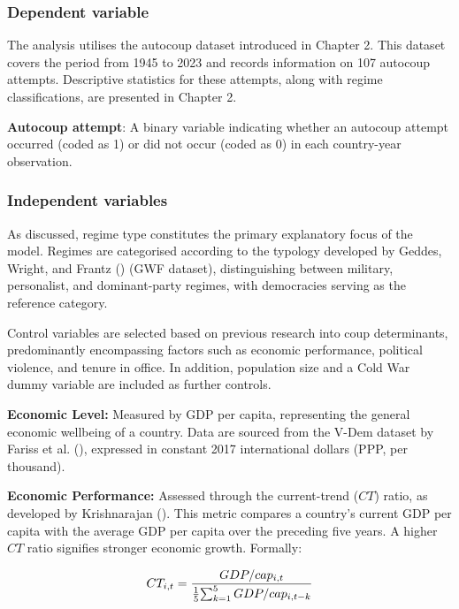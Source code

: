 \documentclass[
  12pt,
]{report}
\begin{document}
\subsubsection*{Dependent variable}\label{dependent-variable}

The analysis utilises the autocoup dataset introduced in Chapter 2. This
dataset covers the period from 1945 to 2023 and records information on
107 autocoup attempts. Descriptive statistics for these attempts, along
with regime classifications, are presented in Chapter 2.

\textbf{Autocoup attempt}: A binary variable indicating whether an
autocoup attempt occurred (coded as 1) or did not occur (coded as 0) in
each country-year observation.

\subsubsection*{Independent variables}\label{independent-variables}

As discussed, regime type constitutes the primary explanatory focus of
the model. Regimes are categorised according to the typology developed
by Geddes, Wright, and Frantz () (GWF
dataset), distinguishing between military, personalist, and
dominant-party regimes, with democracies serving as the reference
category.

Control variables are selected based on previous research into coup
determinants, predominantly encompassing factors such as economic
performance, political violence, and tenure in office. In addition,
population size and a Cold War dummy variable are included as further
controls.

\textbf{Economic Level:} Measured by GDP per capita, representing the
general economic wellbeing of a country. Data are sourced from the V-Dem
dataset by Fariss et al. (), expressed in
constant 2017 international dollars (PPP, per thousand).

\textbf{Economic Performance:} Assessed through the current-trend
(\(CT\)) ratio, as developed by Krishnarajan
(). This metric compares a
country's current GDP per capita with the average GDP per capita over
the preceding five years. A higher \(CT\) ratio signifies stronger
economic growth. Formally:

\[
    \begin{aligned}
    CT_{i,t} = {GDP/cap_{i,t} \over {1 \over 5} {\sum_{k=1}^5GDP/cap_{i,t-k}}}
    \end{aligned}
\]
\end{document}
